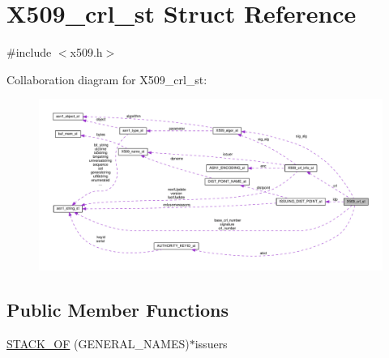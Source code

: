 \hypertarget{struct_x509__crl__st}{}\section{X509\+\_\+crl\+\_\+st Struct Reference}
\label{struct_x509__crl__st}


{\ttfamily \#include $<$x509.\+h$>$}



Collaboration diagram for X509\+\_\+crl\+\_\+st\+:
\nopagebreak
\begin{figure}[H]
\begin{center}
\leavevmode
\includegraphics[width=350pt]{struct_x509__crl__st__coll__graph}
\end{center}
\end{figure}
\subsection*{Public Member Functions}
\begin{DoxyCompactItemize}
\item 
\hyperlink{struct_x509__crl__st_acdcd00699fcec46bbb679c40f93629b9}{S\+T\+A\+C\+K\+\_\+\+OF} (G\+E\+N\+E\+R\+A\+L\+\_\+\+N\+A\+M\+ES)$\ast$issuers
\end{DoxyCompactItemize}
